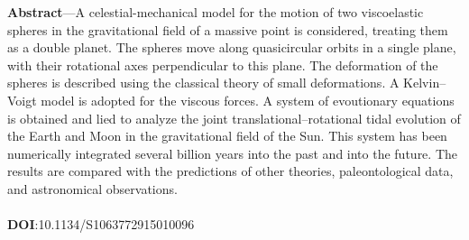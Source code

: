 \documentclass[fontsize = 11pt,a4paper]{article}
\begin{document}
\indent\vbox{
\noindent\textbf{Abstract}—A celestial-mechanical model for the motion of two viscoelastic spheres in the gravitational
field of a massive point is considered, treating them as a double planet. The spheres move along quasicircular
orbits in a single plane, with their rotational axes perpendicular to this plane. The deformation of
the spheres is described using the classical theory of small deformations. A Kelvin–Voigt model is adopted
for the viscous forces. A system of evoutionary equations is obtained and 
lied to analyze the joint
translational–rotational tidal evolution of the Earth and Moon in the gravitational field of the Sun. This
system has been numerically integrated several billion years into the past and into the future. The results
are compared with the predictions of other theories, paleontological data, and astronomical observations.
\\
\\
\textbf{DOI}:10.1134/S1063772915010096
}
\end{document}
